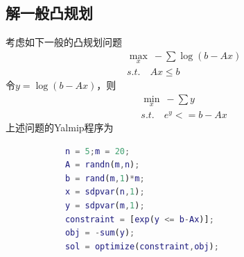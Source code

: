         \subsection{解一般凸规划}
            \par
            考虑如下一般的凸规划问题
            \begin{align*}
            & \max_x \ -\sum \log(b - Ax)\\
            & s.t.\quad Ax \leqslant b
            \end{align*}
            令$y = \log(b-Ax)$，则
            \begin{align*}
            & \min_x \ -\sum y\\
            & s.t. \quad e^y <= b-Ax
            \end{align*}
            上述问题的Yalmip程序为
            \begin{lstlisting}[language = Matlab]
            %% 一般凸规划
            n = 5;m = 20;
            A = randn(m,n);
            b = rand(m,1)*m;
            x = sdpvar(n,1);
            y = sdpvar(m,1);
            constraint = [exp(y <= b-Ax)];
            obj = -sum(y);
            sol = optimize(constraint,obj);
            \end{lstlisting}
